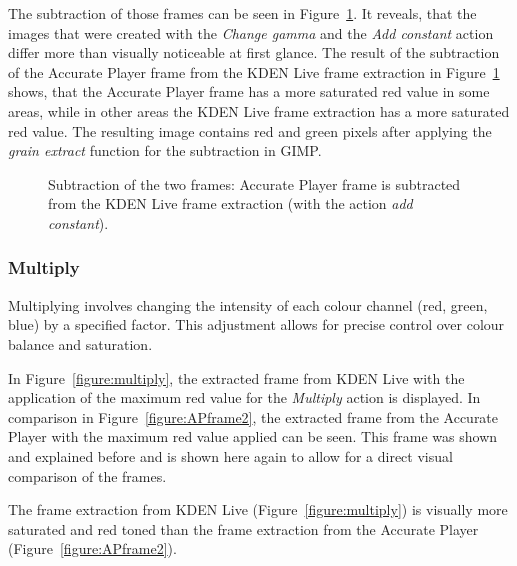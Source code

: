 \documentclass[../MasterThesis.tex]{subfiles}
\begin{document}
The subtraction of those frames can be seen in Figure~\ref{figure:addconstantgimp}. It reveals, that the images that were created with the \textit{Change gamma} and the \textit{Add constant} action differ more than visually noticeable at first glance. The result of the subtraction of the Accurate Player frame from the KDEN Live frame extraction in Figure~\ref{figure:addconstantgimp} shows, that the Accurate Player frame has a more saturated red value in some areas, while in other areas the KDEN Live frame extraction has a more saturated red value. The resulting image contains red and green pixels after applying the \textit{grain extract} function for the subtraction in GIMP.


\begin{figure}[H]
	\begin{center}
		\caption[Subtraction of KDEN Live (\textit{add constant}) and Accurate Player.]{Subtraction of the two frames: Accurate Player frame is subtracted from the KDEN Live frame extraction (with the action \textit{add constant}).}
		\label{figure:addconstantgimp}
	\end{center}
\end{figure}







\subsubsection*{Multiply}

Multiplying involves changing the intensity of each colour channel (red, green, blue) by a specified factor. This adjustment allows for precise control over colour balance and saturation.~\cite{gimp}

In Figure~\ref{figure:multiply}, the extracted frame from KDEN Live with the application of the maximum red value for the \textit{Multiply} action is displayed. 
In comparison in Figure~\ref{figure:APframe2}, the extracted frame from the Accurate Player with the maximum red value applied can be seen. This frame was shown and explained before and is shown here again to allow for a direct visual comparison of the frames.

The frame extraction from KDEN Live (Figure~\ref{figure:multiply}) is visually more saturated and red toned than the frame extraction from the Accurate Player (Figure~\ref{figure:APframe2}).
\end{document}
